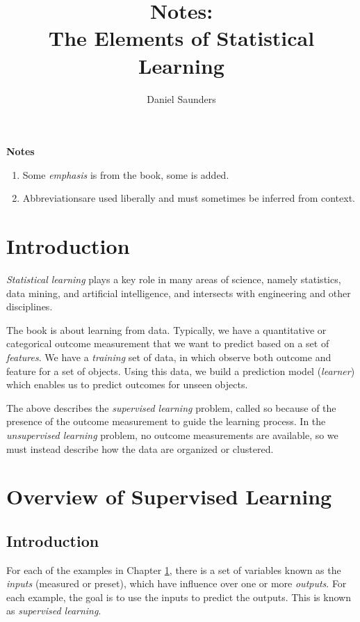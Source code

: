 \documentclass{article}
\title{Notes: \\The Elements of Statistical Learning}
\author{Daniel Saunders}
\numberwithin{equation}{section}
\begin{document}
\maketitle

\textbf{Notes}

\begin{enumerate}
	\item Some \textit{emphasis} is from the book, some is added.
	\item Abbreviationsare used liberally and must sometimes be inferred from context.
\end{enumerate}

\section{Introduction}
\label{chapter:1}

\textit{Statistical learning} plays a key role in many areas of science, namely statistics, data mining, and artificial intelligence, and intersects with engineering and other disciplines.

The book is about learning from data. Typically, we have a quantitative or categorical outcome measurement that we want to predict based on a set of \textit{features}. We have a \textit{training} set of data, in which observe both outcome and feature for a set of objects. Using this data, we build a prediction model (\textit{learner}) which enables us to predict outcomes for unseen objects.

The above describes the \textit{supervised learning} problem, called so because of the presence of the outcome measurement to guide the learning process. In the \textit{unsupervised learning} problem, no outcome measurements are available, so we must instead describe how the data are organized or clustered.

\section{Overview of Supervised Learning}

\subsection{Introduction}

For each of the examples in Chapter \ref{chapter:1}, there is a set of variables known as the \textit{inputs} (measured or preset), which have influence over one or more \textit{outputs}. For each example, the goal is to use the inputs to predict the outputs. This is known as \textit{supervised learning}.
\end{document}
